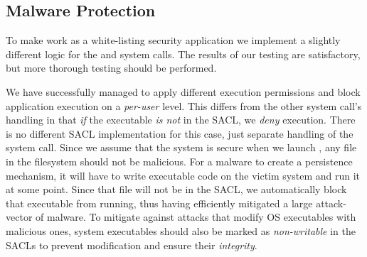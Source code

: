 %
%
%

\subsection{Malware Protection}

\par To make  work as a white-listing security application we implement a slightly different logic for the  and  system calls. The results of our testing are satisfactory, but more thorough testing should be performed. 

\par We have successfully managed to apply different execution permissions and block application execution on a \emph{per-user} level. This differs from the other system call's handling in that \emph{if} the executable \emph{is not} in the \ac{SACL}, we \emph{deny} execution. There is no different \ac{SACL} implementation for this case, just separate handling of the  system call. Since we assume that the system is secure when we launch , any file in the filesystem should not be malicious. For a malware to create a persistence mechanism, it will have to write executable code on the victim system and run it at some point. Since that file will not be in the \ac{SACL}, we automatically block that executable from running, thus having efficiently mitigated a large attack-vector of malware. To mitigate against attacks that modify \ac{OS} executables with malicious ones, system executables should also be marked as \emph{non-writable} in the \acp{SACL} to prevent modification and ensure their \emph{integrity}.

